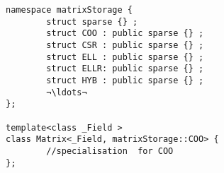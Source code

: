 {
	\small
\def\indexTrait{other}
\begin{lstlisting}
namespace matrixStorage {
        struct sparse {} ;
        struct COO : public sparse {} ;
        struct CSR : public sparse {} ;
        struct ELL : public sparse {} ;
        struct ELLR: public sparse {} ;
        struct HYB : public sparse {} ;
        ¬\ldots¬
};

template<class _Field >
class Matrix<_Field, matrixStorage::COO> {
        //specialisation  for COO
};
\end{lstlisting}
}

